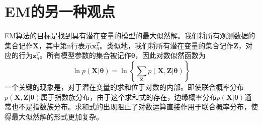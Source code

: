 \section{EM的另一种观点}
EM算法的目标是找到具有潜在变量的模型的最大似然解。我们将所有观测数据的集合记作$\boldsymbol{X}$，其中第n行表示$\boldsymbol{x}_n^T$。类似地，我们将所有潜在变量的集合记作$\boldsymbol{Z}$，对应的行为$\boldsymbol{z}_n^T$。所有模型参数的集合被记作$\boldsymbol{\theta}$，因此对数似然函数为
\begin{equation}
	\ln p(\boldsymbol{X}|\boldsymbol{\theta})=\ln \left\{\sum_{\boldsymbol{Z}}p(\boldsymbol{X},\boldsymbol{Z}|\boldsymbol{\theta}) \right\}
\end{equation}
一个关键的现象是，对于潜在变量的求和位于对数的内部。即使联合概率分布$p(\boldsymbol{X},\boldsymbol{Z}|\boldsymbol{\theta})$属于指数族分布，由于这个求和式的存在，边缘概率分布$p(\boldsymbol{X}|\boldsymbol{\theta})$通常也不是指数族分布。求和式的出现阻止了对数运算直接作用于联合概率分布，使得最大似然解的形式更加复杂。